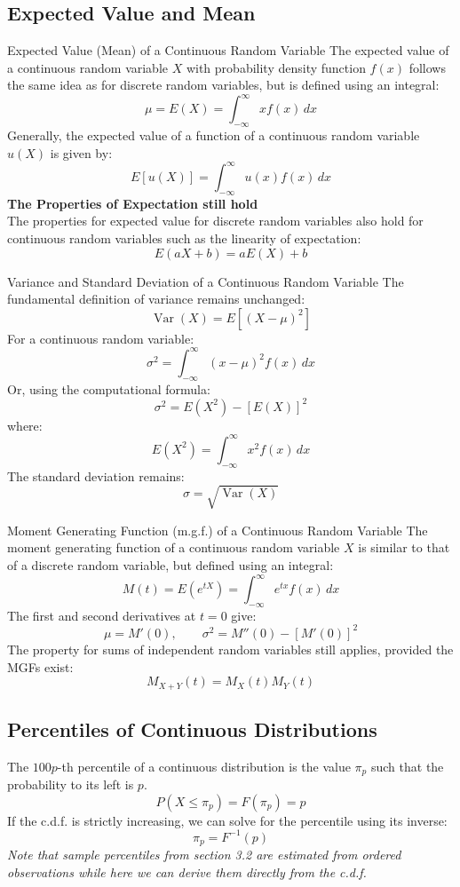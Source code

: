 ﻿\documentclass[12pt]{article}
\begin{document}
\subsection*{Expected Value and Mean}
\begin{definition}{Expected Value (Mean) of a Continuous Random Variable}
The expected value of a continuous random variable \(X\) with probability density function \(f(x)\) follows the same idea as for discrete random variables, but is defined using an integral:
\[
\boxed{\mu=E(X)=\int_{-\infty}^{\infty}xf(x)\,dx}
\]
\newpage
Generally, the expected value of a function of a continuous random variable \(u(X)\) is given by:
\[
\boxed{E[u(X)]=\int_{-\infty}^{\infty}u(x)f(x)\,dx}
\]
\textbf{The Properties of Expectation still hold}\\
The properties for expected value for discrete random variables also hold for continuous random variables such as the linearity of expectation:
\[
E(aX+b)=aE(X)+b
\]
\end{definition}
\begin{definition}{Variance and Standard Deviation of a Continuous Random Variable}
    The fundamental definition of variance remains unchanged:
\[
\operatorname{Var}(X)=E[(X-\mu)^2]
\]
For a continuous random variable:
\[
\boxed{\sigma^2=\int_{-\infty}^{\infty}(x-\mu)^2f(x)\,dx}
\]
Or, using the computational formula:
\[
\boxed{\sigma^2=E(X^2)-[E(X)]^2}
\]
where:
\[
E(X^2)=\int_{-\infty}^{\infty}x^2f(x)\,dx
\]
The standard deviation remains:
\[
\boxed{\sigma=\sqrt{\operatorname{Var}(X)}}
\]
\end{definition}
\begin{definition}{Moment Generating Function (m.g.f.) of a Continuous Random Variable}
The moment generating function of a continuous random variable \(X\) is similar to that of a discrete random variable, but defined using an integral:
\[
\boxed{M(t)=E(e^{tX})=\int_{-\infty}^{\infty}e^{tx}f(x)\,dx}
\]
The first and second derivatives at \(t=0\) give:
\[
\boxed{\mu=M'(0),\qquad \sigma^2=M''(0)-[M'(0)]^2}
\]
The property for sums of independent random variables still applies, provided the MGFs exist:
\[
M_{X+Y}(t)=M_X(t)M_Y(t)
\]
\end{definition}
\subsection*{Percentiles of Continuous Distributions}
The \(100p\)-th percentile of a continuous distribution is the value \(\pi_p\) such that the probability to its left is \(p\).
\[
\boxed{P(X\leq\pi_p)=F(\pi_p)=p}
\]
If the c.d.f. is strictly increasing, we can solve for the percentile using its inverse:
\[
\boxed{\pi_p=F^{-1}(p)}
\]
\textit{Note that sample percentiles from section 3.2 are estimated from ordered observations while here we can derive them directly from the c.d.f.}
\end{document}
